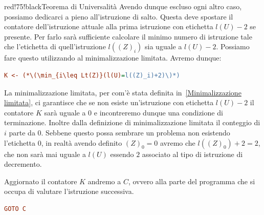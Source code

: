 \begin{halfframedbox}{red!75!black}{Teorema di Universalità}
  Avendo dunque escluso ogni altro caso, possiamo dedicarci a pieno all'istruzione di salto. Questa deve spostare il contatore dell'istruzione attuale alla prima istruzione con etichetta \(l(U)-2\) se presente. Per farlo sarà sufficiente calcolare il minimo numero di istruzione tale che l'etichetta di quell'istruzione \(l({(Z)}_i)\) sia uguale a \(l(U)-2\). Possiamo fare questo utilizzando al minimalizzazione limitata. Avremo dunque:
  \begin{lstlisting}[language=ini, caption={ }]
    K <- (*\(\min_{i\leq Lt(Z)}(l(U)=l((Z)_i)+2)\)*)
  \end{lstlisting}
  La minimalizzazione limitata, per com'è stata definita in~\ref{Minimalizzazione limitata}, ci garantisce che se non esiste un'istruzione con etichetta \(l(U)-2\) il contatore \(K\) sarà uguale a \(0\) e incontreremo dunque una condizione di terminazione. Inoltre dalla definizione di minimalizzazione limitata il conteggio di \(i\) parte da \(0\).
  Sebbene questo possa sembrare un problema non esistendo l'etichetta \(0\), in realtà avendo definito \({(Z)}_0=0\) avremo che \(l({(Z)}_0)+2=2\), che non sarà mai uguale a \(l(U)\) essendo \(2\) associato al tipo di istruzione di decremento.

  Aggiornato il contatore \(K\) andremo a \(C\), ovvero alla parte del programma che si occupa di valutare l'istruzione successiva.
  \begin{lstlisting}[language=ini, caption={ }]
    GOTO C
  \end{lstlisting}

\end{halfframedbox}
\newpage
